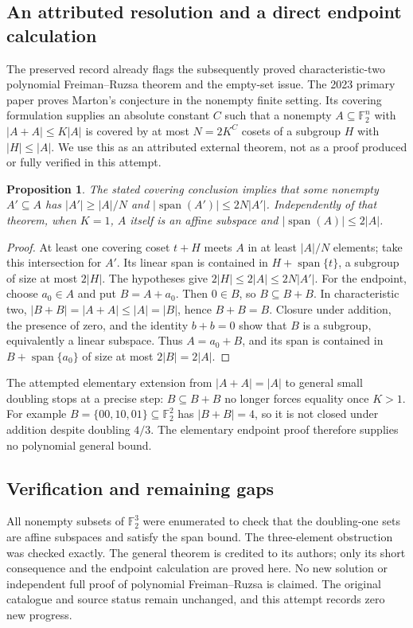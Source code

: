 \documentclass[11pt]{article}
\newtheorem{proposition}{Proposition}
\begin{document}
\subsection{An attributed resolution and a direct endpoint calculation}
The preserved record already flags the subsequently proved characteristic-two polynomial Freiman--Ruzsa theorem and the empty-set issue. The 2023 primary paper proves Marton's conjecture in the nonempty finite setting. Its covering formulation supplies an absolute constant $C$ such that a nonempty $A\subseteq\mathbb F_2^n$ with $|A+A|\le K|A|$ is covered by at most $N=2K^C$ cosets of a subgroup $H$ with $|H|\le|A|$. We use this as an attributed external theorem, not as a proof produced or fully verified in this attempt.
\begin{proposition}
The stated covering conclusion implies that some nonempty $A'\subseteq A$ has $|A'|\ge|A|/N$ and $|\operatorname{span}(A')|\le2N|A'|$. Independently of that theorem, when $K=1$, $A$ itself is an affine subspace and $|\operatorname{span}(A)|\le2|A|$.
\end{proposition}
\begin{proof}
At least one covering coset $t+H$ meets $A$ in at least $|A|/N$ elements; take this intersection for $A'$. Its linear span is contained in $H+\operatorname{span}\{t\}$, a subgroup of size at most $2|H|$. The hypotheses give $2|H|\le2|A|\le2N|A'|$.
For the endpoint, choose $a_0\in A$ and put $B=A+a_0$. Then $0\in B$, so $B\subseteq B+B$. In characteristic two, $|B+B|=|A+A|\le|A|=|B|$, hence $B+B=B$. Closure under addition, the presence of zero, and the identity $b+b=0$ show that $B$ is a subgroup, equivalently a linear subspace. Thus $A=a_0+B$, and its span is contained in $B+\operatorname{span}\{a_0\}$ of size at most $2|B|=2|A|$.
\end{proof}
The attempted elementary extension from $|A+A|=|A|$ to general small doubling stops at a precise step: $B\subseteq B+B$ no longer forces equality once $K>1$. For example $B=\{00,10,01\}\subseteq\mathbb F_2^2$ has $|B+B|=4$, so it is not closed under addition despite doubling $4/3$. The elementary endpoint proof therefore supplies no polynomial general bound.
\subsection{Verification and remaining gaps}
All nonempty subsets of $\mathbb F_2^3$ were enumerated to check that the doubling-one sets are affine subspaces and satisfy the span bound. The three-element obstruction was checked exactly. The general theorem is credited to its authors; only its short consequence and the endpoint calculation are proved here. No new solution or independent full proof of polynomial Freiman--Ruzsa is claimed. The original catalogue and source status remain unchanged, and this attempt records zero new progress.
\end{document}
